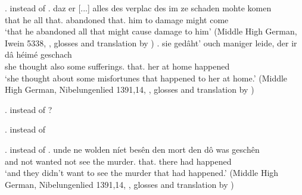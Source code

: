 \ex.  instead of 
\ag. daz er [...] alles des verplac des im ze schaden mohte komen \\
 that he all that. abandoned that. him to damage might come\\
 `that he abandoned all that might cause damage to him' \hfill (Middle High German, Iwein 5338, \citealt[756]{behaghel1923}, glosses and translation by \citealt[198]{pittner1995})
\bg.  sie gedâht' ouch maniger leide, der ir dâ héimé geschach\\
 she thought also some sufferings. that. her at home happened\\
 `she thought about some misfortunes that happened to her at home.' \hfill (Middle High German, Nibelungenlied 1391,14, \citealt[756]{behaghel1923}, glosses and translation by \citealt[198]{pittner1995})

\ex.  instead of ?

\ex.  instead of 




\ex.  instead of 
\ag. unde ne wolden níet besên den mort den dô was geschên\\
 and not wanted not see the murder. that. there had happened\\
 `and they didn't want to see the murder that had happened.' \hfill (Middle High German, Nibelungenlied 1391,14, \citealt[756]{behaghel1923}, glosses and translation by \citealt[198]{pittner1995})









\phantom{x}
